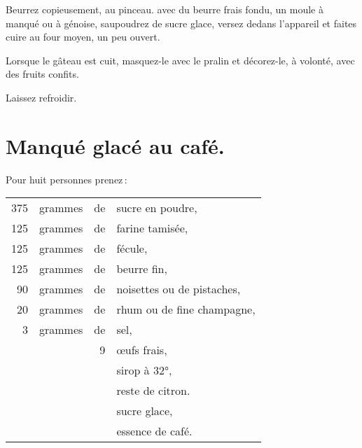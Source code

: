 Beurrez copieusement, au pinceau. avec du beurre frais fondu, un moule à manqué
ou à génoise, saupoudrez de sucre glace, versez dedans l'appareil et faites
cuire au four moyen, un peu ouvert.

Lorsque le gâteau est cuit, masquez-le avec le pralin et décorez-le, à volonté,
avec des fruits confits.

Laissez refroidir.

\section*{\centering Manqué glacé au café.}
{}

Pour huit personnes prenez :

\footnotesize
\begin{longtable}{rrrp{16em}}
    375 & grammes & de & sucre en poudre,                                                                 \\
    125 & grammes & de & farine tamisée,                                                                  \\
    125 & grammes & de & fécule,                                                                          \\
    125 & grammes & de & beurre fin,                                                                      \\
     90 & grammes & de & noisettes ou de pistaches,                                                       \\
     20 & grammes & de & rhum ou de fine champagne,                                                       \\
      3 & grammes & de & sel,                                                                             \\
        &         &  9 & œufs frais,                                                                      \\
        &         &    & sirop à 32°,                                                                     \\
        &         &    & reste de citron.                                                                 \\
        &         &    & sucre glace,                                                                     \\
        &         &    & essence de café.                                                                 \\
\end{longtable}
\normalsize


